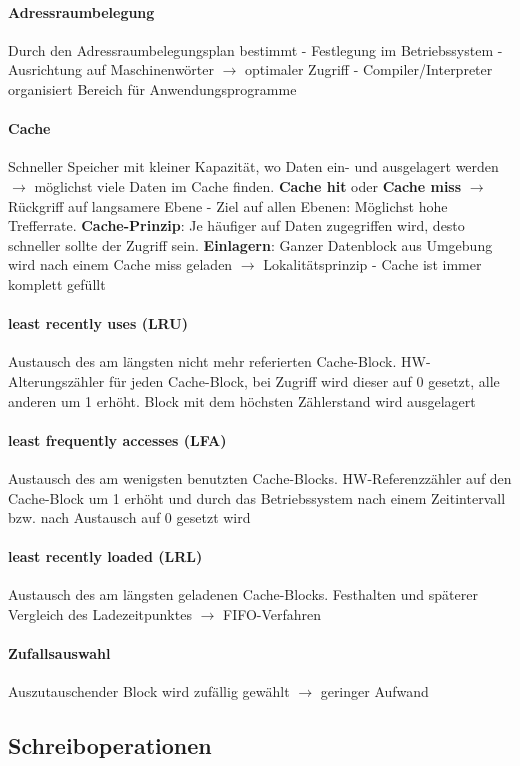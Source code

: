 \documentclass[11pt,a4paper,landscape]{article}
\begin{document}
\begin{multicols*}{3}
	\paragraph{Adressraumbelegung} Durch den Adressraumbelegungsplan bestimmt - Festlegung im Betriebssystem - Ausrichtung auf Maschinenwörter $\rightarrow$ optimaler Zugriff - Compiler/Interpreter organisiert Bereich für Anwendungsprogramme
	\paragraph{Cache} Schneller Speicher mit kleiner Kapazität, wo Daten ein- und ausgelagert werden $\rightarrow$ möglichst viele Daten im Cache finden. \textbf{Cache hit} oder \textbf{Cache miss} $\rightarrow$ Rückgriff auf langsamere Ebene - Ziel auf allen Ebenen: Möglichst hohe Trefferrate. \textbf{Cache-Prinzip}: Je häufiger auf Daten zugegriffen wird, desto schneller sollte der Zugriff sein. \textbf{Einlagern}: Ganzer Datenblock aus Umgebung wird nach einem Cache miss geladen $\rightarrow$ Lokalitätsprinzip - Cache ist immer komplett gefüllt
	\paragraph{least recently uses (LRU)} Austausch des am längsten nicht mehr referierten Cache-Block. HW-Alterungszähler für jeden Cache-Block, bei Zugriff wird dieser auf 0 gesetzt, alle anderen um 1 erhöht. Block mit dem höchsten Zählerstand wird ausgelagert
	\paragraph{least frequently accesses (LFA)} Austausch des am wenigsten benutzten Cache-Blocks. HW-Referenzzähler auf den Cache-Block um 1 erhöht und durch das Betriebssystem nach einem Zeitintervall bzw. nach Austausch auf 0 gesetzt wird
	\paragraph{least recently loaded (LRL)} Austausch des am längsten geladenen Cache-Blocks. Festhalten und späterer Vergleich des Ladezeitpunktes $\rightarrow$ FIFO-Verfahren
	\paragraph{Zufallsauswahl} Auszutauschender Block wird zufällig gewählt $\rightarrow$ geringer Aufwand
	\subsection{Schreiboperationen}

\end{multicols*}
\end{document}
